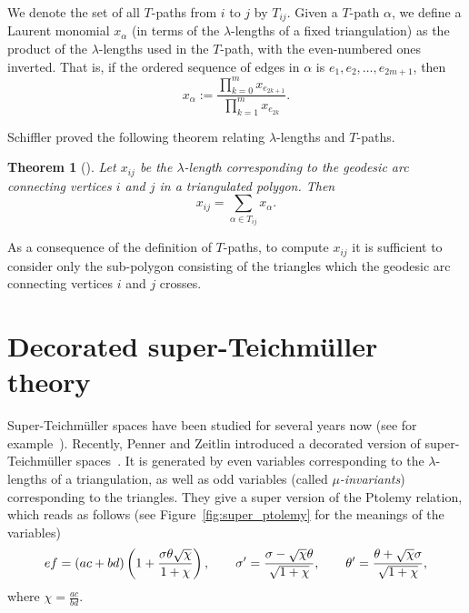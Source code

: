 \documentclass[pdftex]{sigma}
\numberwithin{equation}{section}
\newtheorem{Theorem}{Theorem}[section]
\begin{document}
We denote the set of all $T$-paths from $i$ to $j$ by $T_{ij}$. Given a $T$-path $\alpha$,
we define a Laurent monomial $x_\alpha$ (in terms of the $\lambda$-lengths of a fixed triangulation) as
the product of the $\lambda$-lengths used in the $T$-path, with the even-numbered ones inverted. That is,
if the ordered sequence of edges in $\alpha$ is $e_1, e_2, \dots, e_{2m+1}$, then
\[ x_\alpha := \frac{\prod_{k=0}^m x_{e_{2k+1}}}{\prod_{k=1}^m x_{e_{2k}}}. \]

Schiffler proved the following theorem relating $\lambda$-lengths and $T$-paths.

\begin{Theorem}[{\cite[Theorem 1.2]{schiffler_08}}] Let $x_{ij}$ be the $\lambda$-length corresponding to the geodesic arc
 connecting vertices $i$ and $j$ in a triangulated polygon. Then
 \[ x_{ij} = \sum_{\alpha \in T_{ij}} x_\alpha. \]
\end{Theorem}

\begin{Remark} \label{rem:subtriang}\rm
As a consequence of the definition of $T$-paths, to compute $x_{ij}$ it is sufficient to consider only the sub-polygon consisting of the
triangles which the geodesic arc connecting vertices $i$ and $j$ crosses.
\end{Remark}

\section{Decorated super-Teichm\"{u}ller theory}\label{sec:dec_super}

Super-Teichm\"{u}ller spaces have been studied for several years now (see for example~\cite{cr_88}).
Recently, Penner and Zeitlin introduced a decorated version of super-Teichm\"{u}ller spaces~\cite{pz_19}.
It is generated by even variables corresponding to the
$\lambda$-lengths of a triangulation, as well as odd variables (called \emph{$\mu$-invariants}) corresponding to the triangles. They give
a super version of the Ptolemy relation, which reads as follows (see Figure~\ref{fig:super_ptolemy} for the meanings of the variables)
\begin{gather*}
 ef = (ac+bd)\left( 1+{{\sigma\theta\sqrt{\chi}}\over{1+\chi}}\right),\qquad
 \sigma' = {{\sigma-\sqrt{\chi}\theta}\over{\sqrt{1+\chi}}},\qquad
 \theta' = {{\theta+\sqrt{\chi}\sigma}\over{\sqrt{1+\chi}}},
\end{gather*}
where $ \chi = \frac{ac}{bd}$.


\end{document}
